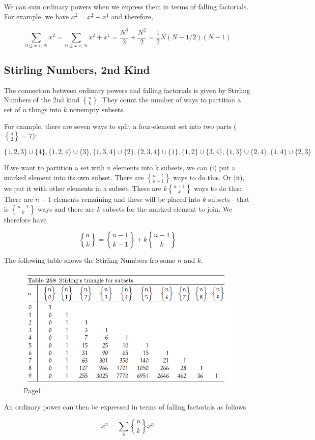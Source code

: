 We can sum ordinary powers when we express them in terms of falling
factorials. For example, we have $x^2 = x^{\underline{2}} + x^{\underline{1}}$ and therefore,

\[
\sum_{0 \leq x < N} x^2 = \sum_{0 \leq x < N} x^{\underline{2}} + x^{\underline{1}} = \frac{N^{\underline{3}}}{3} + \frac{N^{\underline{2}}}{2} = \frac{1}{2} N (N-1/2)(N-1)
\]

\subsection{Stirling Numbers, 2nd Kind}

The connection between ordinary powers and falling factorials is given by Stirling Numbers of the 2nd kind ${n \brace k}$. They count the number of ways to partition a set of $n$ things into $k$ nonempty subsets.

For example, there are seven ways to split a four-element set into two parts (${4 \brace 2} = 7$):

\[
\{1,2,3\} \cup \{4\}, \{1,2,4\} \cup \{3\}, \{1,3,4\} \cup \{2\}, \{2,3,4\} \cup \{1\}, \{1,2\} \cup \{3,4\}, \{1,3\} \cup \{2,4\}, \{1,4\} \cup \{2,3\}
\]

If we want to partition a set with n elements into k subsets, we can (i) put a marked element into its own subset. There are ${n-1 \brace k-1}$ ways to do this. Or (ii), we put it with other elements in a subset. There are $k {n-1 \brace k}$ ways to do this: There are $n-1$ elements remaining and these will be placed into $k$ subsets
- that is ${n-1 \brace k}$ ways and there are $k$ subsets for the marked element to join. We therefore have

\begin{equation}
{n \brace k} = {n-1 \brace k-1} + k {n-1 \brace k}
\end{equation}

The following table shows the Stirling Numbers fro some $n$ and $k$.

\begin{figure}[H]
\includegraphics[scale=0.7]{images/stirling_2nd.png}
\caption{Page1}
\end{figure}

An ordinary power can then be expressed in terms of falling factorials
as follows

\begin{equation}
x^n = \sum_k {n \brace k} x^{\underline{n}}
\end{equation}
